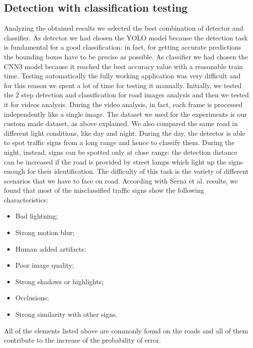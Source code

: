 \subsection{Detection with classification testing}
Analyzing the obtained results we selected the best combination of detector and classifier. As detector we had chosen the YOLO model because the detection task is fundamental for a good classification: in fact, for getting accurate predictions the bounding boxes have to be precise as possible. As classifier we had chosen the CNN3 model because it reached the best accuracy value with a reasonable train time. Testing automatically the fully working application was very difficult and for this reason we spent a lot of time for testing it manually. Initially, we tested the 2 step detection and classification for road images analysis and then we tested it for videos analysis. During the video analysis, in fact, each frame is processed independently like a single image. The dataset we used for the experiments is our custom made dataset, as above explained. We also compared the same road in different light conditions, like day and night. During the day, the detector is able to spot traffic signs from a long range and hence to classify them. During the night, instead, signs can be spotted only at close range: the detection distance can be increased if the road is provided by street lamps which light up the signs enough for their identification. 
The difficulty of this task is the variety of different scenarios that we have to face on road. According with Serna et al. \cite{gamezPaper} results, we found that most of the misclassified traffic signs show the following characteristics:
\begin{itemize}[noitemsep,topsep=0pt]
	\item Bad lightning;
	\item Strong motion blur;
	\item Human added artifacts;
	\item Poor image quality;
	\item Strong shadows or highlights;
	\item Occlusions;
	\item Strong similarity with other signs.
\end{itemize} 
All of the elements listed above are commonly found on the roads and all of them contribute to the increase of the probability of error.